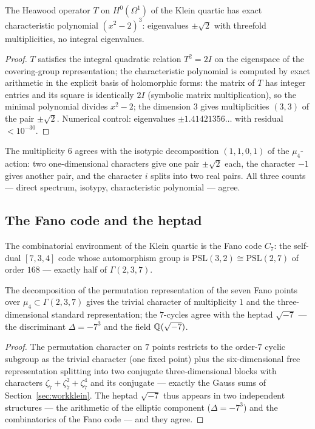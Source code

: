 \begin{proposition}\label{prop:heawood}
The Heawood operator $T$ on $H^0(\Omega^1)$ of the Klein quartic has
exact characteristic polynomial $(x^2-2)^3$: eigenvalues
$\pm\sqrt2$ with threefold multiplicities, no integral eigenvalues.
\end{proposition}

\begin{proof}
$T$ satisfies the integral quadratic relation $T^2=2I$ on the
eigenspace of the covering-group representation; the characteristic
polynomial is computed by exact arithmetic in the explicit basis of
holomorphic forms: the matrix of $T$ has integer entries and its
square is identically $2I$ (symbolic matrix multiplication), so the
minimal polynomial divides $x^2-2$; the dimension $3$ gives
multiplicities $(3,3)$ of the pair $\pm\sqrt2$. Numerical control:
eigenvalues $\pm1.41421356\ldots$ with residual $<10^{-30}$.
\end{proof}

The multiplicity $6$ agrees with the isotypic decomposition $(1,1,0,1)$
of the $\mu_4$-action: two one-dimensional characters give one pair
$\pm\sqrt2$ each, the character $-1$ gives another pair, and the
character $i$ splits into two real pairs. All three counts --- direct
spectrum, isotypy, characteristic polynomial --- agree.

\subsection{The Fano code and the heptad}

The combinatorial environment of the Klein quartic is the Fano code
$C_7$: the self-dual $[7,3,4]$ code whose automorphism group is
$\mathrm{PSL}(3,2)\cong\mathrm{PSL}(2,7)$ of order $168$ --- exactly
half of $\Gamma(2,3,7)$.

\begin{proposition}\label{prop:fano}
The decomposition of the permutation representation of the seven
Fano points over $\mu_4\subset\Gamma(2,3,7)$ gives the trivial
character of multiplicity $1$ and the three-dimensional standard
representation; the $7$-cycles agree with the heptad $\sqrt{-7}$ ---
the discriminant $\Delta=-7^3$ and the field $\mathbb{Q}(\sqrt{-7})$.
\end{proposition}

\begin{proof}
The permutation character on $7$ points restricts to the order-$7$
cyclic subgroup as the trivial character (one fixed point) plus the
six-dimensional free representation splitting into two conjugate
three-dimensional blocks with characters $\zeta_7+\zeta_7^2+\zeta_7^4$
and its conjugate --- exactly the Gauss sums of
Section~\ref{sec:workklein}. The heptad $\sqrt{-7}$ thus appears in
two independent structures --- the arithmetic of the elliptic
component ($\Delta=-7^3$) and the combinatorics of the Fano code ---
and they agree.
\end{proof}

